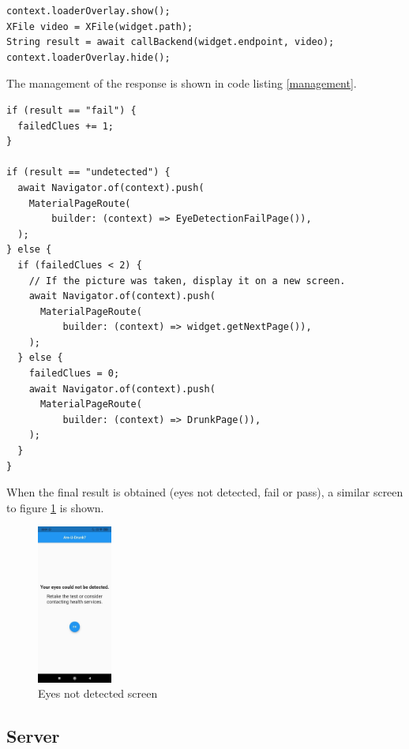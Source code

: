 \begin{lstlisting}[language=flutter, basicstyle=\small, label={preview}, caption={Code to preview the recorded video}, captionpos=b]
context.loaderOverlay.show();
XFile video = XFile(widget.path);
String result = await callBackend(widget.endpoint, video);
context.loaderOverlay.hide();
\end{lstlisting}


The management of the response is shown in code listing \ref{management}.

\begin{lstlisting}[language=flutter, basicstyle=\small, label={management}, caption={Code to manage the response of the backend}, captionpos=b]
if (result == "fail") {
  failedClues += 1;
}

if (result == "undetected") {
  await Navigator.of(context).push(
    MaterialPageRoute(
        builder: (context) => EyeDetectionFailPage()),
  );
} else {
  if (failedClues < 2) {
    // If the picture was taken, display it on a new screen.
    await Navigator.of(context).push(
      MaterialPageRoute(
          builder: (context) => widget.getNextPage()),
    );
  } else {
    failedClues = 0;
    await Navigator.of(context).push(
      MaterialPageRoute(
          builder: (context) => DrunkPage()),
    );
  }
}
\end{lstlisting}
When the final result is obtained (eyes not detected, fail or pass), a similar screen to figure \ref{finalresult} is shown.

\begin{figure}[H]
  \centering
  \includegraphics[width=0.22\textwidth]{./img/finalresult.jpg}
  \caption{Eyes not detected screen}
  \label{finalresult}
\end{figure}

\subsection{Server}

